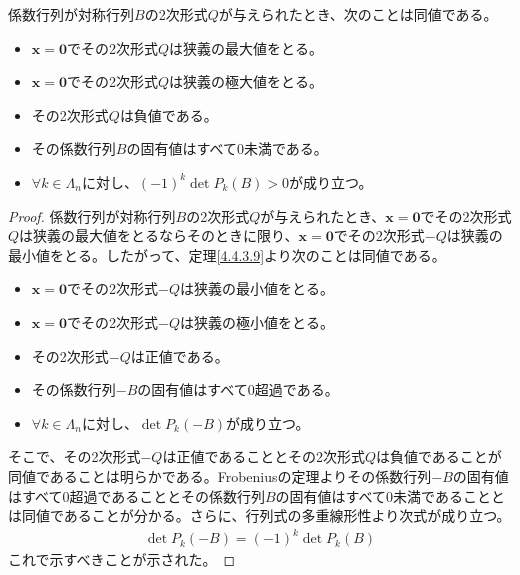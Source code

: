 \documentclass[dvipdfmx]{jsarticle}
\begin{document}
\begin{thm}\label{4.4.3.9}
係数行列が対称行列$B$の2次形式$Q$が与えられたとき、次のことは同値である。
\begin{itemize}
\item
  $\mathbf{x} = \mathbf{0}$でその2次形式$Q$は狭義の最大値をとる。
\item
  $\mathbf{x} = \mathbf{0}$でその2次形式$Q$は狭義の極大値をとる。
\item
  その2次形式$Q$は負値である。
\item
  その係数行列$B$の固有値はすべて$0$未満である。
\item
  $\forall k \in \varLambda_{n}$に対し、$( - 1)^{k}\det{P_{k}(B)} > 0$が成り立つ。
\end{itemize}
\end{thm}
\begin{proof}
係数行列が対称行列$B$の2次形式$Q$が与えられたとき、$\mathbf{x} = \mathbf{0}$でその2次形式$Q$は狭義の最大値をとるならそのときに限り、$\mathbf{x} = \mathbf{0}$でその2次形式$- Q$は狭義の最小値をとる。したがって、定理\ref{4.4.3.9}より次のことは同値である。
\begin{itemize}
\item
  $\mathbf{x} = \mathbf{0}$でその2次形式$- Q$は狭義の最小値をとる。
\item
  $\mathbf{x} = \mathbf{0}$でその2次形式$- Q$は狭義の極小値をとる。
\item
  その2次形式$- Q$は正値である。
\item
  その係数行列$- B$の固有値はすべて$0$超過である。
\item
  $\forall k \in \varLambda_{n}$に対し、$\det{P_{k}( - B)}$が成り立つ。
\end{itemize}
そこで、その2次形式$- Q$は正値であることとその2次形式$Q$は負値であることが同値であることは明らかである。Frobeniusの定理よりその係数行列$- B$の固有値はすべて$0$超過であることとその係数行列$B$の固有値はすべて$0$未満であることとは同値であることが分かる。さらに、行列式の多重線形性より次式が成り立つ。
\begin{align*}
\det{P_{k}( - B)} = ( - 1)^{k}\det{P_{k}(B)}
\end{align*}
これで示すべきことが示された。
\end{proof}
\end{document}
